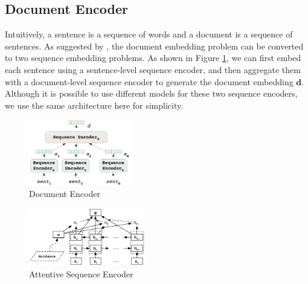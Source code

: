 \subsection{Document Encoder}
\label{sec_doc_encoder}
Intuitively, a sentence is a sequence of words and a document is a sequence of sentences. As suggested by \cite{tang2015document,yang2016hierarchical}, the document embedding problem can be converted to two sequence embedding problems. As shown in Figure \ref{fig_doc_encoder}, we can first embed each sentence using a sentence-level sequence encoder, and then aggregate them with a document-level sequence encoder to generate the document embedding $\mathbf{d}$. 
Although it is possible to use different models for these two sequence encoders, we use the same architecture here for simplicity.

\begin{figure}[htbp]
\begin{center}
\includegraphics[width=0.4\textwidth]{figures/document_encoder.png}	
\caption{Document Encoder}
\label{fig_doc_encoder}
\end{center}
\end{figure}

\begin{figure}[htbp]
\begin{center}
\includegraphics[width=0.45\textwidth]{figures/attentive_seq_encoder.png}	
\caption{Attentive Sequence Encoder}
\label{fig_seq_encoder}
\end{center}
\end{figure}



